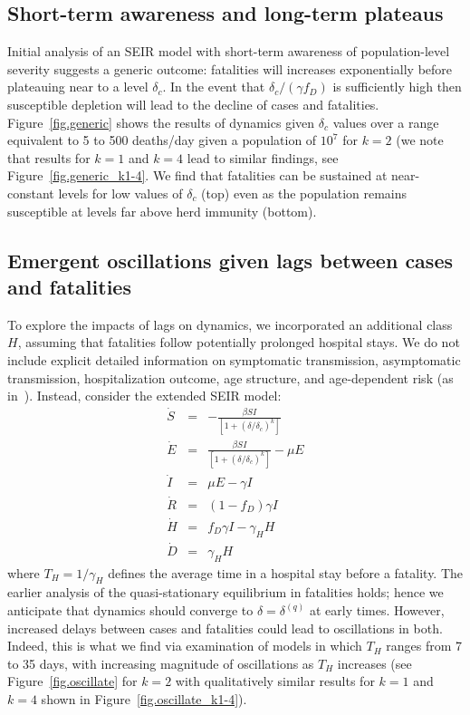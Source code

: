 \subsection{Short-term awareness and long-term plateaus}
Initial analysis of an SEIR model with short-term 
awareness of population-level severity suggests a generic outcome: 
fatalities will increases
exponentially before plateauing near to a level $\delta_c$.
In the event that $\delta_c/(\gamma f_D)$ is sufficiently high then susceptible
depletion will lead to the decline of cases and fatalities.
Figure~\ref{fig.generic} shows
the results of dynamics given $\delta_c$ values over a range 
equivalent to 5 to 500 deaths/day given a population of $10^7$
for $k=2$ (we note that results for $k=1$ and $k=4$ lead to similar
findings, see Figure~\ref{fig.generic_k1-4}.
We find that fatalities can be sustained at near-constant levels
for low values of $\delta_c$ (top)
even as the population remains susceptible at levels far above herd immunity (bottom).

\subsection{Emergent oscillations given lags between cases and fatalities}
To explore the impacts of lags on dynamics,
we incorporated an additional class $H$,
assuming that fatalities follow potentially prolonged
hospital stays.  We do not include explicit
detailed information on symptomatic transmission, asymptomatic
transmission, hospitalization outcome,
age structure, and age-dependent risk (as in~\citep{ferguson2020report}). 
Instead, consider the extended SEIR model:
\begin{eqnarray}
\dot{S} &=& -\frac{\beta SI}{\left[1+\left(\delta/\delta_c\right)^{k}\right]}\\
\dot{E} &=& \frac{\beta SI}{\left[1+\left(\delta/\delta_c\right)^{k}\right]}-\mu E\\
\dot{I} &=& \mu E-\gamma I \\
\dot{R} &=& (1-f_D)\gamma I\\
\dot{H} &=& f_D\gamma I - \gamma_H H\\
\dot{D} &=& \gamma_H H
\end{eqnarray}
where $T_H=1/\gamma_H$ defines the average time in a hospital
stay before a fatality. The earlier analysis of
the quasi-stationary equilibrium in fatalities holds; hence
we anticipate that dynamics should converge to $\delta=\delta^{(q)}$
at early times. However, increased delays between cases and
fatalities could lead to oscillations in both.  Indeed, this
is what we find via examination of models in which
$T_H$ ranges from 7 to 35 days, with increasing magnitude of
oscillations as $T_H$ increases (see Figure~\ref{fig.oscillate} 
for $k=2$ with qualitatively similar results for $k=1$ and
$k=4$ shown in Figure~\ref{fig.oscillate_k1-4}).

